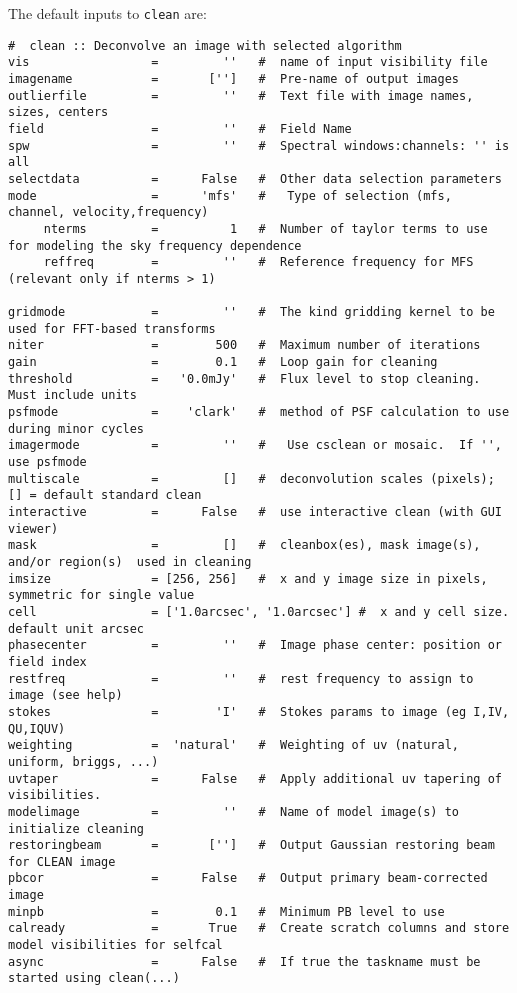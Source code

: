The default inputs to {\tt clean} are:
\small
\begin{verbatim}
#  clean :: Deconvolve an image with selected algorithm
vis                 =         ''   #  name of input visibility file
imagename           =       ['']   #  Pre-name of output images
outlierfile         =         ''   #  Text file with image names, sizes, centers
field               =         ''   #  Field Name
spw                 =         ''   #  Spectral windows:channels: '' is all
selectdata          =      False   #  Other data selection parameters
mode                =      'mfs'   #   Type of selection (mfs, channel, velocity,frequency)
     nterms         =          1   #  Number of taylor terms to use for modeling the sky frequency dependence
     reffreq        =         ''   #  Reference frequency for MFS (relevant only if nterms > 1)

gridmode            =         ''   #  The kind gridding kernel to be used for FFT-based transforms
niter               =        500   #  Maximum number of iterations
gain                =        0.1   #  Loop gain for cleaning
threshold           =   '0.0mJy'   #  Flux level to stop cleaning.  Must include units
psfmode             =    'clark'   #  method of PSF calculation to use during minor cycles
imagermode          =         ''   #   Use csclean or mosaic.  If '', use psfmode
multiscale          =         []   #  deconvolution scales (pixels); [] = default standard clean
interactive         =      False   #  use interactive clean (with GUI viewer)
mask                =         []   #  cleanbox(es), mask image(s), and/or region(s)  used in cleaning
imsize              = [256, 256]   #  x and y image size in pixels, symmetric for single value
cell                = ['1.0arcsec', '1.0arcsec'] #  x and y cell size. default unit arcsec
phasecenter         =         ''   #  Image phase center: position or field index
restfreq            =         ''   #  rest frequency to assign to image (see help)
stokes              =        'I'   #  Stokes params to image (eg I,IV, QU,IQUV)
weighting           =  'natural'   #  Weighting of uv (natural, uniform, briggs, ...)
uvtaper             =      False   #  Apply additional uv tapering of  visibilities.
modelimage          =         ''   #  Name of model image(s) to initialize cleaning
restoringbeam       =       ['']   #  Output Gaussian restoring beam for CLEAN image
pbcor               =      False   #  Output primary beam-corrected image
minpb               =        0.1   #  Minimum PB level to use
calready            =       True   #  Create scratch columns and store model visibilities for selfcal
async               =      False   #  If true the taskname must be started using clean(...)
\end{verbatim}
\normalsize

